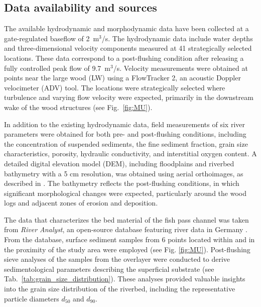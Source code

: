 \documentclass[draft,linenumbers,onecolumn]{agujournal2019} %
\begin{document}
\subsection{Data availability and sources}
\label{sec:Sec2.3}
The available hydrodynamic and morphodynamic data have been collected at a gate-regulated baseflow of 2~m$^3$/s. 
The hydrodynamic data include water depths and three-dimensional velocity components measured at 41 strategically selected locations. 
These data correspond to a post-flushing condition after releasing a fully controlled peak flow of 9.7~m$^3$/s. 
Velocity measurements were obtained at points near the large wood (LW) using a FlowTracker 2, an acoustic Doppler velocimeter (ADV) tool. 
The locations were strategically selected where turbulence and varying flow velocity were expected, primarily in the downstream wake of the wood structures \cite{schalkoFlowTurbulenceDue2024} (see Fig.~\ref{fig:MU}). 

In addition to the existing hydrodynamic data, field measurements of six river parameters were obtained for both pre- and post-flushing conditions, including the concentration of suspended sediments, the fine sediment fraction, grain size characteristics, porosity, hydraulic conductivity, and interstitial oxygen content. 
A detailed digital elevation model (DEM), including floodplains and riverbed bathymetry with a 5 cm resolution, was obtained using aerial orthoimages, as described in \cite{schwindtFuzzylogicIndicatorsRiverbed2023}. 
The bathymetry reflects the post-flushing conditions, in which significant morphological changes were expected, particularly around the wood logs and adjacent zones of erosion and deposition.

The data that characterizes the bed material of the fish pass channel was taken from \textit{River Analyst}, an open-source database featuring river data in Germany \cite{negreirosDatabaseApplicationFramework2023}. From the database, surface sediment samples from 6 points located within and in the proximity of the study area were employed (see Fig. \ref{fig:MU}). Post-flushing sieve analyses of the samples from the overlayer were conducted to derive sedimentological parameters describing the superficial substrate (see Tab.~\ref{tab:grain_size_distribution}). These analyses provided valuable insights into the grain size distribution of the riverbed, including the representative particle diameters \(d_{50}\) and \(d_{90}\). 
\end{document}
